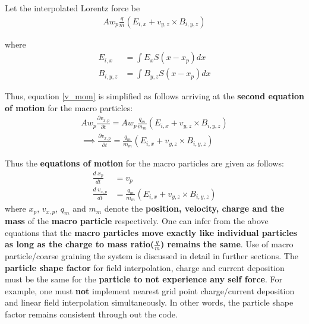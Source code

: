 \documentclass{article}
\begin{document}
Let the interpolated Lorentz force be 
\begin{align}
Aw_{p}\frac{q}{m}(E_{i,x} + v_{y,z}\times B_{i,y,z})
\end{align}

where 
\begin{align}
E_{i,x} &= \int E_{x}S(x - x_{p})dx \\
B_{i,y,z} &= \int B_{y,z}S(x - x_{p})dx
\end{align}

Thus, equation \ref{v_mom} is simplified as follows arriving at the \textbf{second equation of motion} for the macro particles:
\begin{align}
Aw_{p}\frac{\partial v_{x,p}}{\partial t} = Aw_{p}\frac{q_{m}}{m_{m}}(E_{i,x} + v_{y,z} \times B_{i,y,z}) \\
\implies \frac{\partial v_{x,p}}{\partial t} = \frac{q_{m}}{m_{m}}(E_{i,x} + v_{y,z} \times B_{i,y,z})
\end{align}

Thus the \textbf{equations of motion} for the macro particles are given as follows:
\begin{align}
\frac{d\;x_{p}}{dt} &= v_p \\
\frac{d\;v_{x,p}}{dt} &= \frac{q_{m}}{m_{m}}\left(E_{i,x} + v_{y,z} \times B_{i,y,z}\right)
\end{align}
where $x_{p}$, $v_{x,p}$, $q_{m}$ and $m_{m}$ denote the \textbf{position, velocity, charge and the mass} of the \textbf{macro particle} respectively. 
One can infer from the above equations that the \textbf{macro particles move exactly like individual particles as long as the charge to mass ratio($\frac{q}{m}$) remains the same}. Use of macro particle/coarse graining the system is discussed in detail in further sections. The \textbf{particle shape factor} for field interpolation, charge and current deposition must be the same for the \textbf{particle to not experience any self force}\cite{3}. For example, one must \textbf{not} implement nearest grid point charge/current deposition and linear field interpolation simultaneously. In other words, the particle shape factor remains consistent through out the code.
\end{document}
